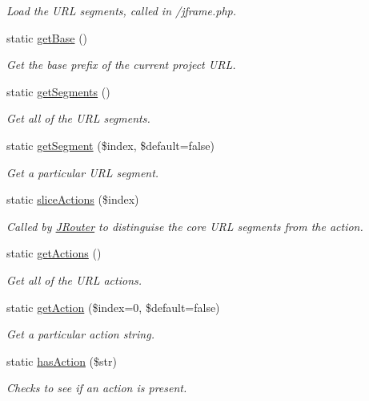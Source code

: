 \begin{DoxyCompactItemize}
\begin{DoxyCompactList}\small\item\em Load the U\-R\-L segments, called in /jframe.php. \end{DoxyCompactList}\item 
static \hyperlink{classJURL_a21ea316b9cdbb77bbf942126900ccfbb}{get\-Base} ()
\begin{DoxyCompactList}\small\item\em Get the base prefix of the current project U\-R\-L. \end{DoxyCompactList}\item 
static \hyperlink{classJURL_a554d3e2f9b34ac8a24a47a29fe7be771}{get\-Segments} ()
\begin{DoxyCompactList}\small\item\em Get all of the U\-R\-L segments. \end{DoxyCompactList}\item 
static \hyperlink{classJURL_a345eac474d5e3a55a4ef004676021976}{get\-Segment} (\$index, \$default=false)
\begin{DoxyCompactList}\small\item\em Get a particular U\-R\-L segment. \end{DoxyCompactList}\item 
static \hyperlink{classJURL_a2ee2ef25880b30675a95be2905c627e4}{slice\-Actions} (\$index)
\begin{DoxyCompactList}\small\item\em Called by \hyperlink{classJRouter}{J\-Router} to distinguise the core U\-R\-L segments from the action. \end{DoxyCompactList}\item 
static \hyperlink{classJURL_a8215f13eb7bbc031d6444ee470bb6c7c}{get\-Actions} ()
\begin{DoxyCompactList}\small\item\em Get all of the U\-R\-L actions. \end{DoxyCompactList}\item 
static \hyperlink{classJURL_a1555aaddcebdc3b13a327e6241c97dd6}{get\-Action} (\$index=0, \$default=false)
\begin{DoxyCompactList}\small\item\em Get a particular action string. \end{DoxyCompactList}\item 
static \hyperlink{classJURL_af0d17fd5b03b7e6048f217499add15a2}{has\-Action} (\$str)
\begin{DoxyCompactList}\small\item\em Checks to see if an action is present. \end{DoxyCompactList}\item 

\end{DoxyCompactItemize}
